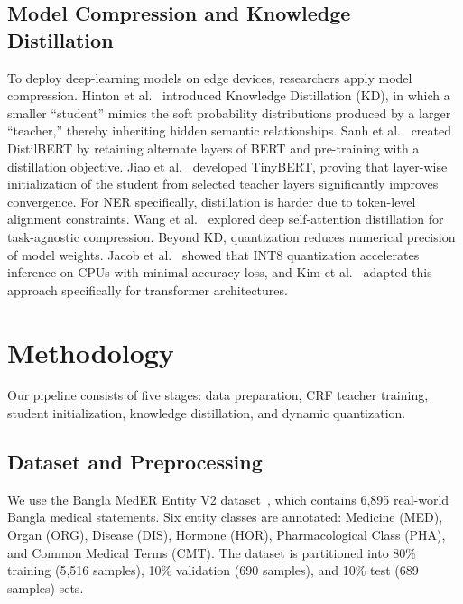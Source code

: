 \documentclass[conference]{IEEEtran}
\begin{document}
\subsection{Model Compression and Knowledge Distillation}
To deploy deep-learning models on edge devices, researchers apply model compression. Hinton et al.~\cite{b13} introduced Knowledge Distillation (KD), in which a smaller ``student'' mimics the soft probability distributions produced by a larger ``teacher,'' thereby inheriting hidden semantic relationships. Sanh et al.~\cite{b14} created DistilBERT by retaining alternate layers of BERT and pre-training with a distillation objective. Jiao et al.~\cite{b15} developed TinyBERT, proving that layer-wise initialization of the student from selected teacher layers significantly improves convergence. For NER specifically, distillation is harder due to token-level alignment constraints. Wang et al.~\cite{b16} explored deep self-attention distillation for task-agnostic compression. Beyond KD, quantization reduces numerical precision of model weights. Jacob et al.~\cite{b17} showed that INT8 quantization accelerates inference on CPUs with minimal accuracy loss, and Kim et al.~\cite{b18} adapted this approach specifically for transformer architectures.

\section{Methodology}

Our pipeline consists of five stages: data preparation, CRF teacher training, student initialization, knowledge distillation, and dynamic quantization.

\subsection{Dataset and Preprocessing}
We use the Bangla MedER Entity V2 dataset~\cite{b5}, which contains 6,895 real-world Bangla medical statements. Six entity classes are annotated: Medicine (MED), Organ (ORG), Disease (DIS), Hormone (HOR), Pharmacological Class (PHA), and Common Medical Terms (CMT). The dataset is partitioned into 80\% training (5,516 samples), 10\% validation (690 samples), and 10\% test (689 samples) sets.
\end{document}
